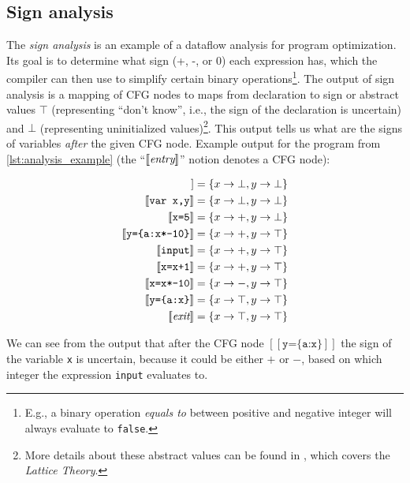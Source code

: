 \documentclass[thesis=M,english]{FITthesis}[2019/12/23]
\begin{document}
\subsection{Sign analysis}
The \emph{sign analysis} is an example of a dataflow analysis for program optimization. Its goal is to determine what sign (+, -, or 0) each expression has, which the compiler can then use to simplify certain binary operations\footnote{E.g., a binary operation \emph{equals to} between positive and negative integer will always evaluate to \texttt{false}.}. The output of sign analysis is a mapping of CFG nodes to maps from declaration to sign or abstract values $\top$ (representing “don't know”, i.e., the sign of the declaration is uncertain) and $\bot$ (representing uninitialized values)\footnote{More details about these abstract values can be found in \cite[Chap. 4]{spa}, which covers the \emph{Lattice Theory}.}. This output tells us what are the signs of variables \emph{after} the given CFG node. Example output for the program from \autoref{lst:analysis_example} (the “$[\![ \emph{entry} ]\!]$” notion denotes a CFG node):

\begin{align*}
    [\![ \emph{entry} ]\!] &= \{ x \rightarrow \bot, y \rightarrow \bot \}\\
    [\![ \texttt{var x,y} ]\!] &= \{ x \rightarrow \bot, y \rightarrow \bot \}\\
    [\![ \texttt{x=5} ]\!] &= \{ x \rightarrow +, y \rightarrow \bot \}\\
    [\![ \texttt{y=\{a:x*-10\}} ]\!] &= \{ x \rightarrow +, y \rightarrow \top \}\\
    [\![ \texttt{input} ]\!] &= \{ x \rightarrow +, y \rightarrow \top \}\\
    [\![ \texttt{x=x+1} ]\!] &= \{ x \rightarrow +, y \rightarrow \top \}\\
    [\![ \texttt{x=x*-10} ]\!] &= \{ x \rightarrow -, y \rightarrow \top \}\\
    [\![ \texttt{y=\{a:x\}} ]\!] &= \{ x \rightarrow \top, y \rightarrow \top \}\\
    [\![ \emph{exit} ]\!] &= \{ x \rightarrow \top, y \rightarrow \top \}
\end{align*}

We can see from the output that after the CFG node $[\![ \texttt{y=\{a:x\}} ]\!]$ the sign of the variable \texttt{x} is uncertain, because it could be either $+$ or $-$, based on which integer the expression \texttt{input} evaluates to.
\end{document}
